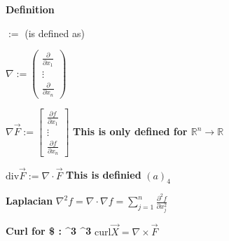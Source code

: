 \documentclass{tufte-book}
\begin{document}
\textbf{Definition}

\(:=\) (is defined as)

\(\nabla := \begin{pmatrix} \frac{\partial}{\partial x_1} \\ \vdots \\ \frac{\partial}{\partial x_n}\end{pmatrix}\)

\(\nabla \vec{F} := \begin{bmatrix} \frac{\partial f}{\partial x_1} \\ \vdots \\ \frac{\partial f}{\partial x_n}\end{bmatrix}\)
\textbf{This is only defined for \(\mathbb{R}^n \to \mathbb{R}\)}

\(\text{div} \vec{F} := \nabla \cdot \vec{F}\) \textbf{This is definied}
\((a)_4\)

\textbf{Laplacian}
\(\nabla ^2 f = \nabla \cdot \nabla f = \sum_{j=1}^n \frac{\partial ^2 f}{\partial x^2_j}\)

\textbf{Curl for \$ : \^{}3 \to {}\^{}3}
\(\text{curl} \vec{X} = \nabla \times \vec{F}\)
\end{document}
